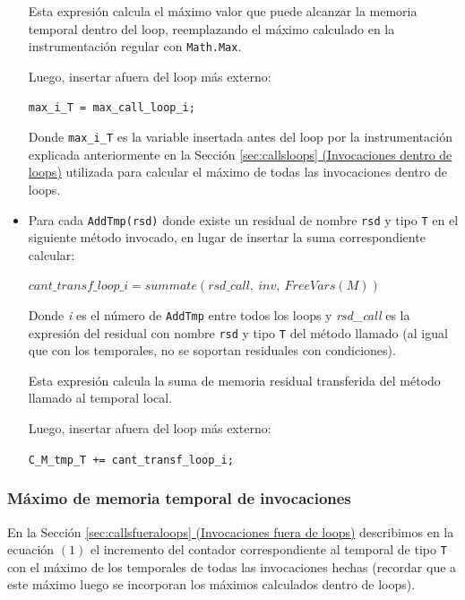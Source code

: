 \documentclass[12pt,a4paper]{article}
\newcommand\mono[1]{\texttt{#1}}
\begin{document}
\begin{itemize}
						Esta expresión calcula el máximo valor que puede alcanzar la memoria temporal dentro del loop, reemplazando el máximo calculado en la instrumentación regular con \mono{Math.Max}.

						Luego, insertar afuera del loop más externo:

						\begin{center}
						\mono{max\_i\_T = max\_call\_loop\_i;}
						\end{center}

						Donde \mono{max\_i\_T} es la variable insertada antes del loop por la instrumentación explicada anteriormente en la Sección \hyperref[sec:callsloops]{\ref*{sec:callsloops} (Invocaciones dentro de loops)} utilizada para calcular el máximo de todas las invocaciones dentro de loops.
					\item
						Para cada \mono{AddTmp(rsd)} donde existe un residual de nombre \mono{rsd} y tipo \mono{T} en el siguiente método invocado, en lugar de insertar la suma correspondiente calcular:

						\begin{center}
						$cant\_transf\_loop\_i = summate(rsd\_call,\ inv,\ \mathit{FreeVars}(M))$
						\end{center}

						Donde \textit{i} es el número de \mono{AddTmp} entre todos los loops y \textit{rsd\_call} es la expresión del residual con nombre \mono{rsd} y tipo \mono{T} del método llamado (al igual que con los temporales, no se soportan residuales con condiciones).

						Esta expresión calcula la suma de memoria residual transferida del método llamado al temporal local.

						Luego, insertar afuera del loop más externo:

						\begin{center}
						\mono{C\_M\_tmp\_T += cant\_transf\_loop\_i;}
						\end{center}
				\end{itemize}
			\subsubsection{Máximo de memoria temporal de invocaciones}
				En la Sección \hyperref[sec:callsfueraloops]{\ref*{sec:callsfueraloops} (Invocaciones fuera de loops)} describimos en la ecuación $(1)$ el incremento del contador correspondiente al temporal de tipo \mono{T} con el máximo de los temporales de todas las invocaciones hechas (recordar que a este máximo luego se incorporan los máximos calculados dentro de loops).
\end{document}
